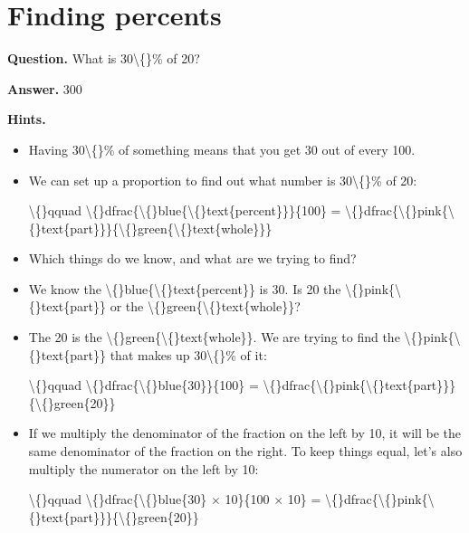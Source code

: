\documentclass{article}
\begin{document}
\section*{Finding percents}
\textbf{Question.} What is 30\textbackslash\{\}\% of 20?

\textbf{Answer.} 300

\textbf{Hints.}
\begin{itemize}
  \item Having 30\textbackslash\{\}\% of something means that you get
                        30 out of every 100.
  \item We can set up a proportion to find out what number is
                            30\textbackslash\{\}\% of 20:
                        
                        
                            \textbackslash\{\}qquad \textbackslash\{\}dfrac\{\textbackslash\{\}blue\{\textbackslash\{\}text\{percent\}\}\}\{100\} =
                            \textbackslash\{\}dfrac\{\textbackslash\{\}pink\{\textbackslash\{\}text\{part\}\}\}\{\textbackslash\{\}green\{\textbackslash\{\}text\{whole\}\}\}
  \item Which things do we know, and what are we trying to find?
  \item We know the \textbackslash\{\}blue\{\textbackslash\{\}text\{percent\}\} is 30.
                        Is 20 the \textbackslash\{\}pink\{\textbackslash\{\}text\{part\}\}
                        or the \textbackslash\{\}green\{\textbackslash\{\}text\{whole\}\}?
  \item The 20 is the \textbackslash\{\}green\{\textbackslash\{\}text\{whole\}\}.
                            We are trying to find the \textbackslash\{\}pink\{\textbackslash\{\}text\{part\}\}
                            that makes up 30\textbackslash\{\}\% of it:
                        
                        
                            \textbackslash\{\}qquad \textbackslash\{\}dfrac\{\textbackslash\{\}blue\{30\}\}\{100\} = \textbackslash\{\}dfrac\{\textbackslash\{\}pink\{\textbackslash\{\}text\{part\}\}\}\{\textbackslash\{\}green\{20\}\}
  \item If we multiply the denominator of the fraction on the left by 10,
                            it will be the same denominator of the fraction on the right.
                            To keep things equal, let's also multiply the numerator on the left by 10:
                        
                        
                            \textbackslash\{\}qquad \textbackslash\{\}dfrac\{\textbackslash\{\}blue\{30\} $\times$ 10\}\{100 $\times$ 10\} =
                            \textbackslash\{\}dfrac\{\textbackslash\{\}pink\{\textbackslash\{\}text\{part\}\}\}\{\textbackslash\{\}green\{20\}\}
                        

\end{itemize}
\end{document}
